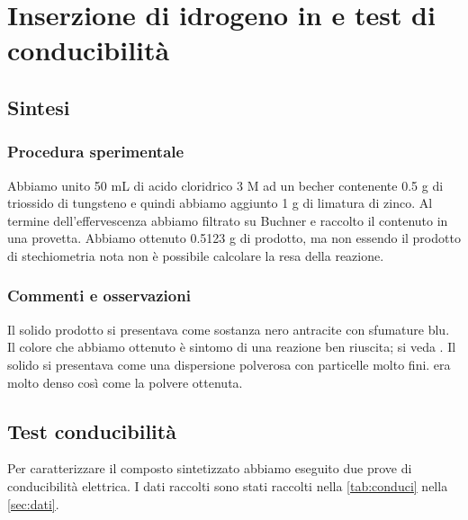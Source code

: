 \section{Inserzione di idrogeno in  e  test di conducibilità}
\subsection{Sintesi}
\subsubsection{Procedura sperimentale}

Abbiamo unito 50 mL di acido cloridrico 3 M ad un becher contenente 0.5 g di triossido di tungsteno e quindi abbiamo aggiunto 1 g di limatura di zinco. Al termine dell’effervescenza abbiamo filtrato su Buchner e raccolto il contenuto in una provetta. Abbiamo ottenuto 0.5123 g di prodotto, ma non essendo il prodotto di stechiometria nota non è possibile calcolare la resa della reazione.




\subsubsection{Commenti e osservazioni}


Il solido prodotto si presentava come sostanza nero antracite con sfumature blu. Il colore che abbiamo ottenuto è sintomo di una reazione ben riuscita; si veda \cite{conduzione}. Il solido si presentava come una dispersione polverosa con particelle molto fini.
 era molto denso così come la polvere ottenuta. %

\subsection{Test conducibilità}

Per caratterizzare il composto sintetizzato abbiamo eseguito due prove di conducibilità elettrica. I dati raccolti sono stati raccolti nella \autoref{tab:conduci} nella \autoref{sec:dati}.





